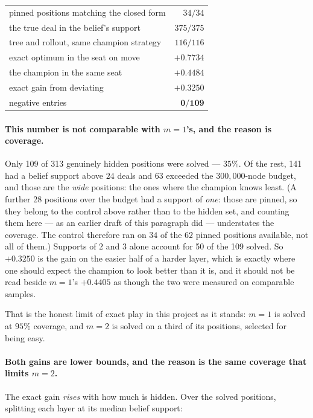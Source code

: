 \documentclass[11pt,a4paper]{article}
\begin{document}
\begin{center}
\begin{tabular}{lr}
\toprule
pinned positions matching the closed form & $34/34$ \\
the true deal in the belief's support & $375/375$ \\
tree and rollout, same champion strategy & $116/116$ \\
\midrule
exact optimum in the seat on move & $+0.7734$ \\
the champion in the same seat & $+0.4484$ \\
\midrule
exact gain from deviating & $\mathbf{+0.3250}$ \\
negative entries & $\mathbf{0/109}$ \\
\bottomrule
\end{tabular}
\end{center}

\paragraph{This number is not comparable with $m = 1$'s, and the reason is
coverage.} Only 109 of 313 genuinely hidden positions were solved ---
$35\%$. Of the rest, 141 had a belief support above $24$ deals and 63 exceeded
the $300{,}000$-node budget, and those are the \emph{wide} positions: the ones
where the champion knows least. (A further 28 positions over the budget had a
support of \emph{one}: those are pinned, so they belong to the control above
rather than to the hidden set, and counting them here --- as an earlier draft
of this paragraph did --- understates the coverage. The control therefore ran
on $34$ of the $62$ pinned positions available, not all of them.) Supports of $2$ and $3$ alone account for
50 of the 109 solved. So $+0.3250$ is the gain on the easier half of a harder
layer, which is exactly where one should expect the champion to look better
than it is, and it should not be read beside $m = 1$'s $+0.4405$ as though the
two were measured on comparable samples.

That is the honest limit of exact play in this project as it stands: $m = 1$ is
solved at $95\%$ coverage, and $m = 2$ is solved on a third of its positions,
selected for being easy.


\paragraph{Both gains are lower bounds, and the reason is the same coverage
that limits $m = 2$.} The exact gain \emph{rises} with how much is hidden. Over
the solved positions, splitting each layer at its median belief support:
\end{document}
